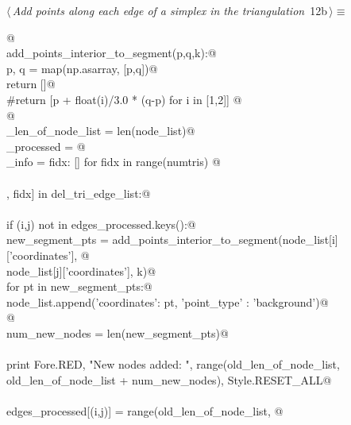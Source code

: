 \documentclass[11.5pt]{report}
\begin{document}
\begin{flushleft} \small
\begin{minipage}{\linewidth}\label{scrap14}\raggedright\small
{} $\langle\,${\itshape Add points along each edge of a simplex in the triangulation}\nobreak\ {\footnotesize {12b}}$\,\rangle\equiv$
\vspace{-1ex}
\begin{list}{}{} \item
\mbox{}\verb@   @\\
\mbox{}\verb@def add_points_interior_to_segment(p,q,k):@\\
\mbox{}\verb@    p, q = map(np.asarray, [p,q])@\\
\mbox{}\verb@    return []@\\
\mbox{}\verb@    #return [p + float(i)/3.0 * (q-p) for i in [1,2]] @\\
\mbox{}\verb@ @\\
\mbox{}\verb@old_len_of_node_list = len(node_list)@\\
\mbox{}\verb@edges_processed      = {}@\\
\mbox{}\verb@face_info            = { fidx: [] for fidx in range(numtris)  }@\\
\mbox{}\verb@@\\
\mbox{}\verb@for [[i,j], fidx] in del_tri_edge_list:@\\
\mbox{}\verb@@\\
\mbox{}\verb@      if (i,j) not in edges_processed.keys():@\\
\mbox{}\verb@              new_segment_pts = add_points_interior_to_segment(node_list[i]['coordinates'], @\\
\mbox{}\verb@                                                       node_list[j]['coordinates'], k)@\\
\mbox{}\verb@              for pt in new_segment_pts:@\\
\mbox{}\verb@                  node_list.append({'coordinates': pt, 'point_type' : 'background'})@\\
\mbox{}\verb@    @\\
\mbox{}\verb@              num_new_nodes = len(new_segment_pts)@\\
\mbox{}\verb@@\\
\mbox{}\verb@              print Fore.RED, "New nodes added: ", range(old_len_of_node_list, old_len_of_node_list + num_new_nodes), Style.RESET_ALL@\\
\mbox{}\verb@@\\
\mbox{}\verb@              edges_processed[(i,j)] = range(old_len_of_node_list, @\\

\end{list}
\end{minipage}
\end{flushleft}
\end{document}
